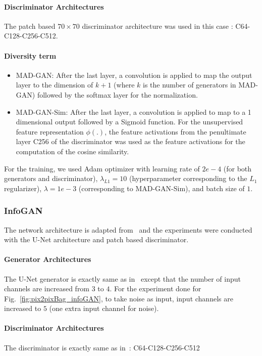 \paragraph{Discriminator Architectures}
The patch based $70\times 70$ discriminator architecture was used in this case : C64-C128-C256-C512.

\paragraph{Diversity term}
\begin{itemize}
	\item MAD-GAN: After the last layer, a convolution is applied to map the output layer to the dimension of $k+1$ (where $k$ is the number of generators in MAD-GAN) followed by the softmax layer for the normalization. 
	\item MAD-GAN-Sim: After the last layer, a convolution is applied to map to a 1 dimensional output followed by a Sigmoid function. For the unsupervised feature representation $\phi(.)$, the feature activations from the penultimate layer C256 of the discriminator was used as the feature activations for the computation of the cosine similarity. 
\end{itemize}

For the training, we used Adam optimizer with learning rate of $2e-4$ (for both generators and discriminator), $\lambda_{L1} = 10$ (hyperparameter corresponding to the $L_1$ regularizer), $\lambda = 1e-3$ (corresponding to MAD-GAN-Sim), and batch size of $1$.

\subsubsection{InfoGAN}
\label{subsection:InfoArch}
The network architecture is adapted from~\cite{isola2016image2image} and the experiments were conducted with the U-Net architecture and patch based discriminator.

\paragraph{Generator Architectures}
The U-Net generator is exactly same as in~\cite{isola2016image2image} except that the number of input channels are increased from $3$ to $4$. For the experiment done for Fig.~\ref{fig:pix2pixBag_infoGAN}, to take noise as input, input channels are increased to $5$ (one extra input channel for noise).

\paragraph{Discriminator Architectures}
The discriminator is exactly same as in~\cite{isola2016image2image}: C64-C128-C256-C512

